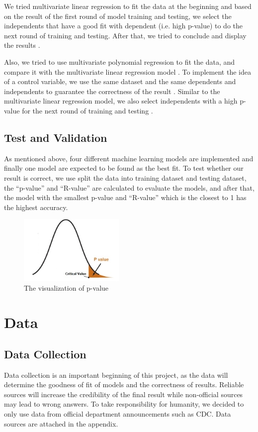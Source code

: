 \documentclass{article}
\begin{document}
\begin{multicols}{2}
We tried multivariate linear regression to fit the data at the beginning and based on the result of the first round of model training and testing, we select the independents that have a good fit with dependent (i.e. high p-value) to do the next round of training and testing. After that, we tried to conclude and display the results \cite{ogundokun2020predictive,arino2020simple}.

Also, we tried to use multivariate polynomial regression to fit the data, and compare it with the multivariate linear regression model \cite{yan2020interpretable}. To implement the idea of a control variable, we use the same dataset and the same dependents and independents to guarantee the correctness of the result \cite{giordano2020sidarthe,fernandez2020estimating}. Similar to the multivariate linear regression model, we also select independents with a high p-value for the next round of training and testing \cite{gromping2006relative}.

\subsection{Test and Validation}
As mentioned above, four different machine learning models are implemented and finally one model are expected to be found as the best fit. To test whether our result is correct, we use split the data into training dataset and testing dataset, the “p-value” and “R-value” are calculated to evaluate the models, and after that, the model with the smallest p-value and “R-value” which is the closest to 1 has the highest accuracy.

\begin{figure}[H]
    \centering
    \includegraphics[width=0.45\textwidth]{pvalue.jpg}
    \caption{The visualization of p-value}
\end{figure}

\section{Data}
\subsection{Data Collection}
Data collection is an important beginning of this project, as the data will determine the goodness of fit of models and the correctness of results. Reliable sources will increase the credibility of the final result while non-official sources may lead to wrong answers. To take responsibility for humanity, we decided to only use data from official department announcements such as CDC. Data sources are attached in the appendix.


\end{multicols}
\end{document}
